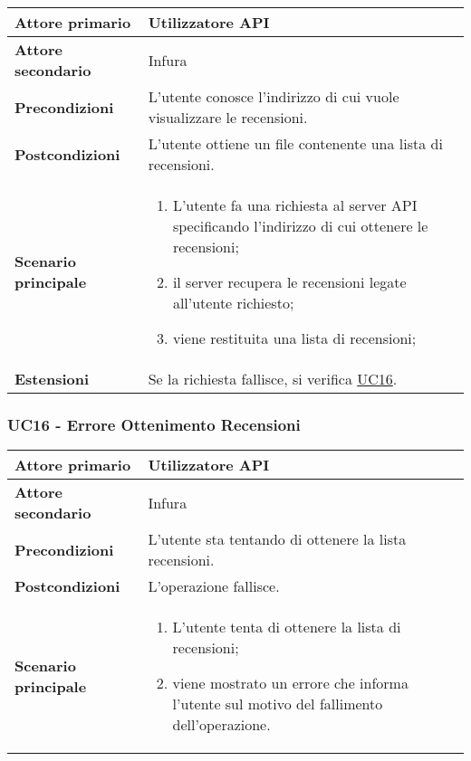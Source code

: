 \begin{center}
\renewcommand{\arraystretch}{1.5}
\begin{tabular}{ | m{10em} | m{20em} | }
    \hline
    \textbf{Attore primario} & Utilizzatore API \\
    \hline
    \textbf{Attore secondario} & Infura \\
    \hline
    \textbf{Precondizioni} & L'utente conosce l'indirizzo di cui vuole visualizzare le recensioni. \\
    \hline
    \textbf{Postcondizioni} & L'utente ottiene un file contenente una lista di recensioni. \\
    \hline
    \textbf{Scenario principale} & \begin{enumerate}
        \item L'utente fa una richiesta al server API specificando l'indirizzo di cui
              ottenere le recensioni;
        \item il server recupera le recensioni legate all'utente richiesto;
        \item viene restituita una lista di recensioni;
    \end{enumerate} \\
    \hline
    \textbf{Estensioni} & Se la richiesta fallisce, si verifica \hyperref[UC16]{UC16}. \\
    \hline
   \end{tabular}
\end{center}

\subsubsection{UC16 - Errore Ottenimento Recensioni}
\label{UC16}
\begin{center}
\renewcommand{\arraystretch}{1.5}
\begin{tabular}{ | m{10em} | m{20em} | }
    \hline
    \textbf{Attore primario} & Utilizzatore API \\
    \hline
    \textbf{Attore secondario} & Infura \\
    \hline
    \textbf{Precondizioni} & L'utente sta tentando di ottenere la lista recensioni. \\
    \hline
    \textbf{Postcondizioni} & L'operazione fallisce. \\
    \hline
    \textbf{Scenario principale} & \begin{enumerate}
        \item L'utente tenta di ottenere la lista di recensioni;
        \item viene mostrato un errore che informa l'utente sul motivo del fallimento
              dell'operazione.
    \end{enumerate} \\
    \hline
   \end{tabular}
\end{center}